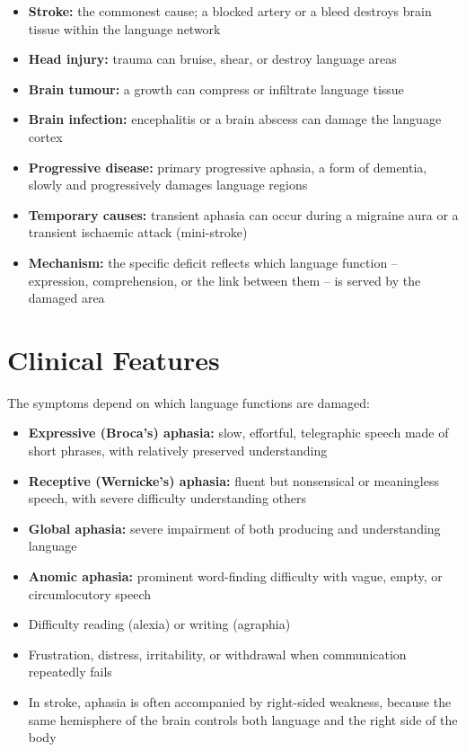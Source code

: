 \begin{itemize}
    \item \textbf{Stroke:} the commonest cause; a blocked artery or a bleed destroys brain tissue within the language network
    \item \textbf{Head injury:} trauma can bruise, shear, or destroy language areas
    \item \textbf{Brain tumour:} a growth can compress or infiltrate language tissue
    \item \textbf{Brain infection:} encephalitis or a brain abscess can damage the language cortex
    \item \textbf{Progressive disease:} primary progressive aphasia, a form of dementia, slowly and progressively damages language regions
    \item \textbf{Temporary causes:} transient aphasia can occur during a migraine aura or a transient ischaemic attack (mini-stroke)
    \item \textbf{Mechanism:} the specific deficit reflects which language function -- expression, comprehension, or the link between them -- is served by the damaged area
\end{itemize}

\section*{Clinical Features}
The symptoms depend on which language functions are damaged:

\begin{itemize}
    \item \textbf{Expressive (Broca's) aphasia:} slow, effortful, telegraphic speech made of short phrases, with relatively preserved understanding
    \item \textbf{Receptive (Wernicke's) aphasia:} fluent but nonsensical or meaningless speech, with severe difficulty understanding others
    \item \textbf{Global aphasia:} severe impairment of both producing and understanding language
    \item \textbf{Anomic aphasia:} prominent word-finding difficulty with vague, empty, or circumlocutory speech
    \item Difficulty reading (alexia) or writing (agraphia)
    \item Frustration, distress, irritability, or withdrawal when communication repeatedly fails
    \item In stroke, aphasia is often accompanied by right-sided weakness, because the same hemisphere of the brain controls both language and the right side of the body
\end{itemize}

